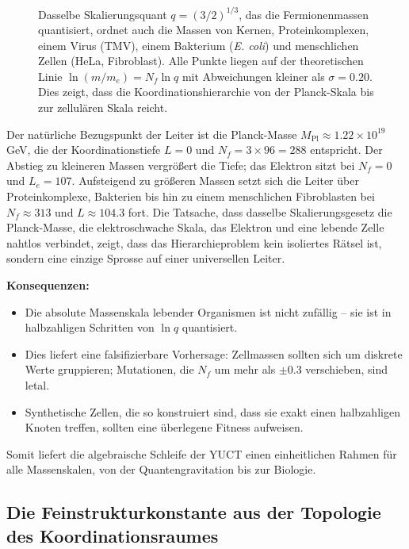 \documentclass[12pt,a4paper]{article}
\begin{document}
\begin{figure}[htbp]
		\caption{Dasselbe Skalierungsquant \(q = (3/2)^{1/3}\), das die Fermionenmassen quantisiert, ordnet auch die Massen von Kernen, Proteinkomplexen, einem Virus (TMV), einem Bakterium (\textit{E. coli}) und menschlichen Zellen (HeLa, Fibroblast). Alle Punkte liegen auf der theoretischen Linie \(\ln(m/m_e) = N_f \ln q\) mit Abweichungen kleiner als \(\sigma = 0.20\). Dies zeigt, dass die Koordinationshierarchie von der Planck-Skala bis zur zellulären Skala reicht.}
		\label{fig:full_ladder}
	\end{figure}
	
	Der natürliche Bezugspunkt der Leiter ist die Planck-Masse \(M_{\mathrm{Pl}} \approx 1.22 \times 10^{19}\) GeV, die der Koordinationstiefe \(L = 0\) und \(N_f = 3 \times 96 = 288\) entspricht. Der Abstieg zu kleineren Massen vergrößert die Tiefe; das Elektron sitzt bei \(N_f = 0\) und \(L_e = 107\). Aufsteigend zu größeren Massen setzt sich die Leiter über Proteinkomplexe, Bakterien bis hin zu einem menschlichen Fibroblasten bei \(N_f \approx 313\) und \(L \approx 104.3\) fort. Die Tatsache, dass dasselbe Skalierungsgesetz die Planck-Masse, die elektroschwache Skala, das Elektron und eine lebende Zelle nahtlos verbindet, zeigt, dass das Hierarchieproblem kein isoliertes Rätsel ist, sondern eine einzige Sprosse auf einer universellen Leiter.
	
	\textbf{Konsequenzen:}
	\begin{itemize}
		\item Die absolute Massenskala lebender Organismen ist nicht zufällig – sie ist in halbzahligen Schritten von \(\ln q\) quantisiert.
		\item Dies liefert eine falsifizierbare Vorhersage: Zellmassen sollten sich um diskrete Werte gruppieren; Mutationen, die \(N_f\) um mehr als \(\pm0.3\) verschieben, sind letal.
		\item Synthetische Zellen, die so konstruiert sind, dass sie exakt einen halbzahligen Knoten treffen, sollten eine überlegene Fitness aufweisen.
	\end{itemize}
	
	Somit liefert die algebraische Schleife der YUCT einen einheitlichen Rahmen für alle Massenskalen, von der Quantengravitation bis zur Biologie.
	
	\subsection{Die Feinstrukturkonstante aus der Topologie des Koordinationsraumes}
	\label{subsec:alpha-topology}
	
\end{document}
